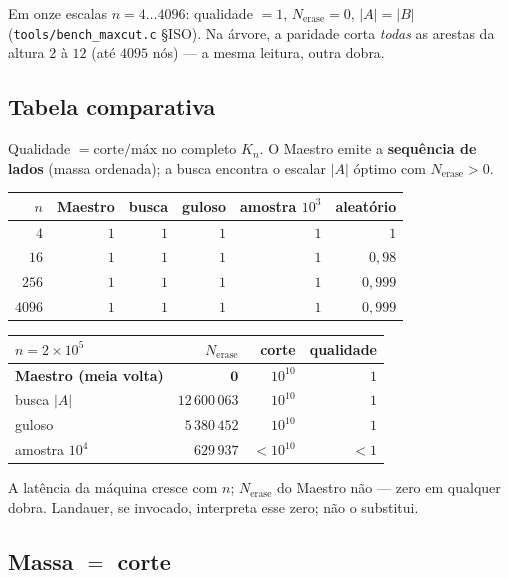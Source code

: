 \documentclass[11pt,a4paper]{article}
\newcommand{\code}[1]{\texttt{\small #1}}
\begin{document}
\noindent Em onze escalas $n=4\ldots4096$: qualidade $=1$, $N_{\mathrm{erase}}=0$, $|A|=|B|$
(\code{tools/bench\_maxcut.c} §ISO). Na árvore, a paridade corta \emph{todas} as arestas da altura
$2$ à $12$ (até $4095$ nós) --- a mesma leitura, outra dobra.

\subsection*{Tabela comparativa}

Qualidade $=\mathrm{corte}/\mathrm{máx}$ no completo $K_n$. O Maestro emite a \textbf{sequência de
lados} (massa ordenada); a busca encontra o escalar $|A|$ óptimo com $N_{\mathrm{erase}}>0$.

\begin{center}\small
\begin{tabular}{@{}rrrrrr@{}}
\toprule
$n$ & Maestro & busca & guloso & amostra $10^{3}$ & aleatório \\
\midrule
$4$ & $1$ & $1$ & $1$ & $1$ & $1$ \\
$16$ & $1$ & $1$ & $1$ & $1$ & $0{,}98$ \\
$256$ & $1$ & $1$ & $1$ & $1$ & $0{,}999$ \\
$4096$ & $1$ & $1$ & $1$ & $1$ & $0{,}999$ \\
\bottomrule
\end{tabular}
\end{center}

\begin{center}\small
\begin{tabular}{@{}lrrr@{}}
\toprule
$n=2\times10^{5}$ & $N_{\mathrm{erase}}$ & corte & qualidade \\
\midrule
\textbf{Maestro (meia volta)} & $\mathbf{0}$ & $10^{10}$ & $1$ \\
busca $|A|$ & $12\,600\,063$ & $10^{10}$ & $1$ \\
guloso & $5\,380\,452$ & $10^{10}$ & $1$ \\
amostra $10^{4}$ & $629\,937$ & $<10^{10}$ & $<1$ \\
\bottomrule
\end{tabular}
\end{center}

\noindent A latência da máquina cresce com $n$; $N_{\mathrm{erase}}$ do Maestro não --- zero em
qualquer dobra. Landauer, se invocado, interpreta esse zero; não o substitui.

\subsection*{Massa $=$ corte}
\end{document}
